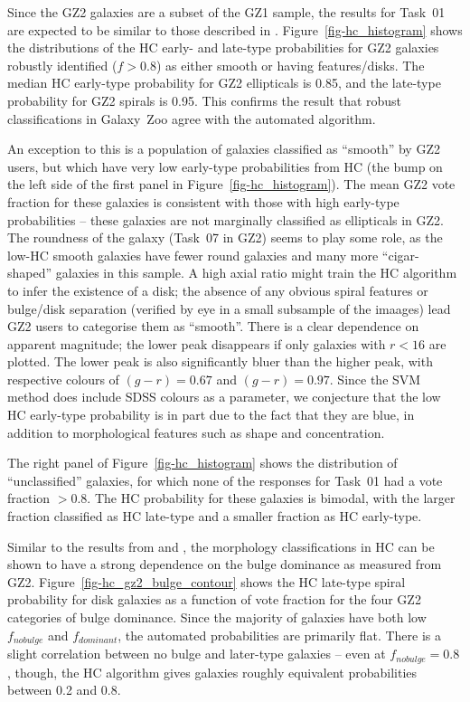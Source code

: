 \documentclass[useAMS,usenatbib]{mn2e}
\begin{document}
Since the GZ2 galaxies are a subset of the GZ1 sample, the results for Task~01 are expected to be similar to those described in \citet{hue11}. Figure~\ref{fig-hc_histogram} shows the distributions of the HC early- and late-type probabilities for GZ2 galaxies robustly identified ($f>0.8$) as either smooth or having features/disks. The median HC early-type probability for GZ2 ellipticals is 0.85, and the late-type probability for GZ2 spirals is 0.95. This confirms the result that robust classifications in Galaxy~Zoo agree with the automated algorithm. 

An exception to this is a population of galaxies classified as ``smooth'' by GZ2 users, but which have very low early-type probabilities from HC (the bump on the left side of the first panel in Figure~\ref{fig-hc_histogram}). The mean GZ2 vote fraction for these galaxies is consistent with those with high early-type probabilities -- these galaxies are not marginally classified as ellipticals in GZ2. The roundness of the galaxy (Task~07 in GZ2) seems to play some role, as the low-HC smooth galaxies have fewer round galaxies and many more ``cigar-shaped'' galaxies in this sample. A high axial ratio might train the HC algorithm to infer the existence of a disk; the absence of any obvious spiral features or bulge/disk separation (verified by eye in a small subsample of the imaages) lead GZ2 users to categorise them as ``smooth''. There is a clear dependence on apparent magnitude; the lower peak disappears if only galaxies with $r<16$ are plotted. The lower peak is also significantly bluer than the higher peak, with respective colours of $(g-r)=0.67$ and $(g-r)=0.97$. Since the SVM method does include SDSS colours as a parameter, we conjecture that the low HC early-type probability is in part due to the fact that they are blue, in addition to morphological features such as shape and concentration. %

The right panel of Figure~\ref{fig-hc_histogram} shows the distribution of ``unclassified'' galaxies, for which none of the responses for Task~01 had a vote fraction $>0.8$. The HC probability for these galaxies is bimodal, with the larger fraction classified as HC late-type and a smaller fraction as HC early-type. 

Similar to the results from \citet{nai10} and \citet{bai11}, the morphology classifications in HC can be shown to have a strong dependence on the bulge dominance as measured from GZ2. Figure~\ref{fig-hc_gz2_bulge_contour} shows the HC late-type spiral probability for disk galaxies as a function of vote fraction for the four GZ2 categories of bulge dominance. Since the majority of galaxies have both low $f_{no bulge}$ and $f_{dominant}$, the automated probabilities are primarily flat. There is a slight correlation between no bulge and later-type galaxies -- even at $f_{no bulge}=0.8$, though, the HC algorithm gives galaxies roughly equivalent probabilities between 0.2 and 0.8. 
\end{document}
